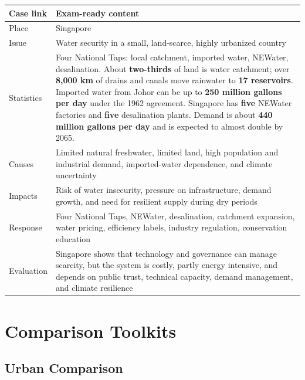 \documentclass[11pt,a4paper]{article}
\newcommand{\term}[1]{\textcolor{HeadingBlue}{\textbf{#1}}}
\begin{document}
\begin{tabularx}{\textwidth}{L{0.18\textwidth}Y}
\toprule
\textbf{Case link} & \textbf{Exam-ready content} \\
\midrule
Place & Singapore \\
Issue & Water security in a small, land-scarce, highly urbanized country \\
Statistics & Four National Taps: local catchment, imported water, NEWater,
desalination. About \term{two-thirds} of land is water catchment; over
\term{8,000 km} of drains and canals move rainwater to \term{17 reservoirs}.
Imported water from Johor can be up to \term{250 million gallons per day}
under the 1962 agreement. Singapore has \term{five} NEWater factories and
\term{five} desalination plants. Demand is about \term{440 million gallons per
day} and is expected to almost double by 2065. \\
Causes & Limited natural freshwater, limited land, high population and
industrial demand, imported-water dependence, and climate uncertainty \\
Impacts & Risk of water insecurity, pressure on infrastructure, demand growth,
and need for resilient supply during dry periods \\
Response & Four National Taps, NEWater, desalination, catchment expansion,
water pricing, efficiency labels, industry regulation, conservation education \\
Evaluation & Singapore shows that technology and governance can manage
scarcity, but the system is costly, partly energy intensive, and depends on
public trust, technical capacity, demand management, and climate resilience \\
\bottomrule
\end{tabularx}

\section{Comparison Toolkits}

\subsection{Urban Comparison}
\end{document}
